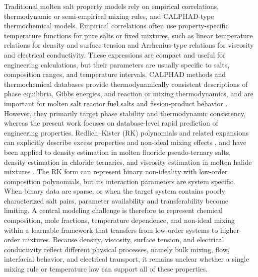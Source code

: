 \documentclass[journal=jctcce,manuscript=article,doi=true]{achemso}
\begin{document}
Traditional molten salt property models rely on empirical correlations, thermodynamic or semi-empirical mixing rules, and CALPHAD-type thermochemical models. Empirical correlations often use property-specific temperature functions for pure salts or fixed mixtures, such as linear temperature relations for density and surface tension and Arrhenius-type relations for viscosity and electrical conductivity. These expressions are compact and useful for engineering calculations, but their parameters are usually specific to salts, composition ranges, and temperature intervals. CALPHAD methods and thermochemical databases provide thermodynamically consistent descriptions of phase equilibria, Gibbs energies, and reaction or mixing thermodynamics, and are important for molten salt reactor fuel salts and fission-product behavior \cite{xiong2022fundamental,besmann2024applications}. However, they primarily target phase stability and thermodynamic consistency, whereas the present work focuses on database-level rapid prediction of engineering properties. Redlich--Kister (RK) polynomials and related expansions can explicitly describe excess properties and non-ideal mixing effects \cite{redlich1948algebraic}, and have been applied to density estimation in molten fluoride pseudo-ternary salts, density estimation in chloride ternaries, and viscosity estimation in molten halide mixtures \cite{birri2022redlich,birri2024viscosity,agca2022empirical,gallagher2022assessment}. The RK form can represent binary non-ideality with low-order composition polynomials, but its interaction parameters are system specific. When binary data are sparse, or when the target system contains poorly characterized salt pairs, parameter availability and transferability become limiting. A central modeling challenge is therefore to represent chemical composition, mole fractions, temperature dependence, and non-ideal mixing within a learnable framework that transfers from low-order systems to higher-order mixtures. Because density, viscosity, surface tension, and electrical conductivity reflect different physical processes, namely bulk mixing, flow, interfacial behavior, and electrical transport, it remains unclear whether a single mixing rule or temperature law can support all of these properties.
\end{document}
